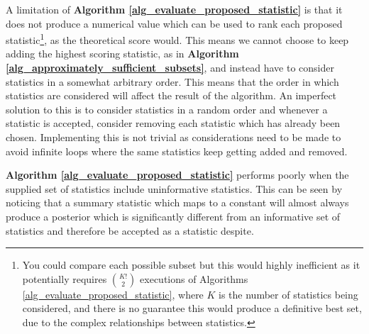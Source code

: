 \documentclass[11pt,a4paper]{article}
\theoremstyle{break}
\begin{document}
  \par A limitation of \textbf{Algorithm \ref{alg_evaluate_proposed_statistic}} is that it does not produce a numerical value which can be used to rank each proposed statistic\footnote{You could compare each possible subset but this would highly inefficient as it potentially requires $\binom{K!}2$ executions of Algorithms \ref{alg_evaluate_proposed_statistic}, where $K$ is the number of statistics being considered, and there is no guarantee this would produce a definitive best set, due to the complex relationships between statistics.}, as the theoretical score would. This means we cannot choose to keep adding the highest scoring statistic, as in \textbf{Algorithm \ref{alg_approximately_sufficient_subsets}}, and instead have to consider statistics in a somewhat arbitrary order. This means that the order in which statistics are considered will affect the result of the algorithm. An imperfect solution to this is to consider statistics in a random order and whenever a statistic is accepted, consider removing each statistic which has already been chosen. Implementing this is not trivial as considerations need to be made to avoid infinite loops where the same statistics keep getting added and removed.

  \par \textbf{Algorithm \ref{alg_evaluate_proposed_statistic}} performs poorly when the supplied set of statistics include uninformative statistics. This can be seen by noticing that a summary statistic which maps to a constant will almost always produce a posterior which is significantly different from an informative set of statistics and therefore be accepted as a statistic despite.

\end{document}
